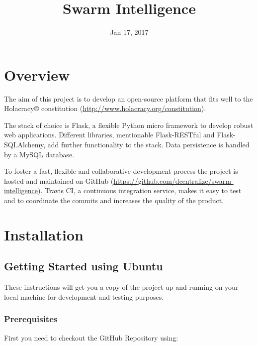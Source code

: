 \documentclass[letterpaper,10pt,english]{sphinxmanual}
\title{Swarm Intelligence}
\date{Jan 17, 2017}
\author{}
\begin{document}
\maketitle
\sphinxtableofcontents
{}\label{\detokenize{index::doc}}



\chapter{Overview}
\label{\detokenize{overview::doc}}\label{\detokenize{overview:swarm-intelligence-platform}}\label{\detokenize{overview:overview}}
The aim of this project is to develop an open-source platform that fits well to the Holacracy® constitution (\url{http://www.holacracy.org/constitution}).

The stack of choice is Flask, a flexible Python micro framework to develop robust web applications.  Different libraries, mentionable Flask-RESTful and Flask-SQLAlchemy, add further functionality to the stack. Data persistence is handled by a MySQL database.

To foster a fast, flexible and collaborative development process the project is hosted and maintained on GitHub (\url{https://github.com/dcentralize/swarm-intelligence}). Travis CI, a continuous integration service, makes it easy to test and to coordinate the commits and increases the quality of the product.


\chapter{Installation}
\label{\detokenize{installation::doc}}\label{\detokenize{installation:installation}}

\section{Getting Started using Ubuntu}
\label{\detokenize{installation:getting-started-using-ubuntu}}
These instructions will get you a copy of the project up and running on your local machine for development and testing purposes.


\subsection{Prerequisites}
\label{\detokenize{installation:prerequisites}}
First you need to checkout the GitHub Repository using:

\begin{sphinxVerbatim}[commandchars=\\\{\}]
  
\end{sphinxVerbatim}
\end{document}
